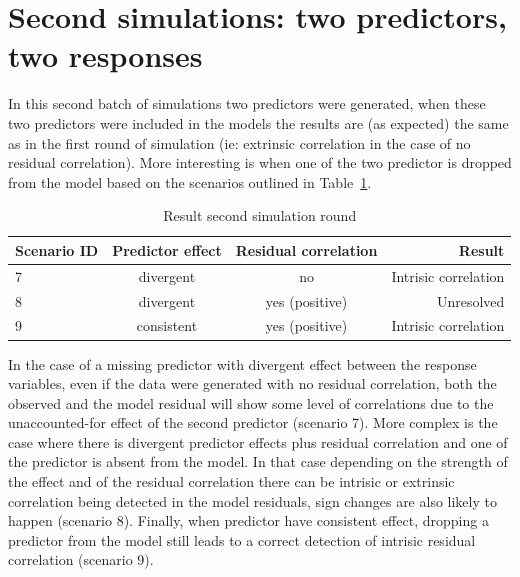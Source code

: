 \documentclass[a4paper,10pt]{article}
\begin{document}
\section*{Second simulations: two predictors, two responses}

In this second batch of simulations two predictors were generated, when these two predictors were included in the models the results are (as expected) the same as in the first round of simulation (ie: extrinsic correlation in the case of no residual correlation). More interesting is when one of the two predictor is dropped from the model based on the scenarios outlined in Table~\ref{tab:sim2}.

\begin{table}[h!]
\caption{Result second simulation round}
\label{tab:sim2}
 \begin{tabular}{lccr}
  Scenario ID & Predictor effect & Residual correlation & Result \\ \hline
  7 & divergent & no & Intrisic correlation \\
  8 & divergent & yes (positive) & Unresolved \\
  9 & consistent & yes (positive) & Intrisic correlation 
 \end{tabular}
\end{table}

In the case of a missing predictor with divergent effect between the response variables, even if the data were generated with no residual correlation, both the observed and the model residual will show some level of correlations due to the unaccounted-for effect of the second predictor (scenario 7). More complex is the case where there is divergent predictor effects plus residual correlation and one of the predictor is absent from the model. In that case depending on the strength of the effect and of the residual correlation there can be intrisic or extrinsic correlation being detected in the model residuals, sign changes are also likely to happen (scenario 8). Finally, when predictor have consistent effect, dropping a predictor from the model still leads to a correct detection of intrisic residual correlation (scenario 9). 
\end{document}
